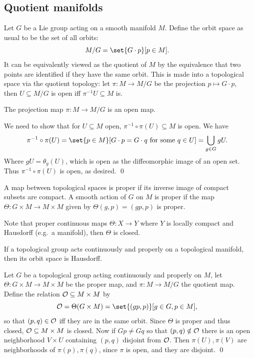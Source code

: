 \eexam

\subsection{Quotient manifolds}

\bdefn

    Let $G$ be a Lie group acting on a smooth manifold $M$.
    Define the {\emphcolor orbit space} as usual to be the set of all orbits:
    $$ M/G = \set{G\cdot p}[p\in M] . $$
    It can be equivalently viewed as the quotient of $M$ by the equivalence that two points are identified if they have the same orbit.
    This is made into a topological space via the quotient topology: let $\pi\colon M\to M/G$ be the projection $p\mapsto G\cdot p$,
    then $U\subseteq M/G$ is open iff $\pi^{-1}U\subseteq M$ is.

\edefn

\blemm

    The projection map $\pi\colon M\to M/G$ is an open map.

\elemm

\bproof

    We need to show that for $U\subseteq M$ open, $\pi^{-1}\circ\pi(U)\subseteq M$ is open.
    We have
    $$ \pi^{-1}\circ\pi(U) = \set{p\in M}[G\cdot p=G\cdot q\hbox{ for some $q\in U$}] = \bigcup_{g\in G}gU . $$
    Where $gU=\theta_g(U)$, which is open as the diffeomorphic image of an open set.
    Thus $\pi^{-1}\circ\pi(U)$ is open, as desired.
    \qed

\eproof

\bdefn

    A map between topological spaces is {\emphcolor proper} if its inverse image of compact subsets are compact.
    A smooth action of $G$ on $M$ is {\emphcolor proper} if the map $\Theta\colon G\times M\to M\times M$ given by $\Theta(g,p)=(gp,p)$ is proper.

\edefn

Note that proper continuous maps $\Theta\colon X\to Y$ where $Y$ is locally compact and Hausdorff (e.g.\ a manifold), then $\Theta$ is closed.

\blemm

    If a topological group acts continuously and properly on a topological manifold, then its orbit space is Hausdorff.

\elemm

\bproof

    Let $G$ be a topological group acting continuously and properly on $M$, let $\Theta\colon G\times M\to M\times M$ be the proper map,
    and $\pi\colon M\to M/G$ the quotient map.
    Define the relation ${\cal O}\subseteq M\times M$ by
    $$ \c O = \Theta(G\times M) = \set{(gp,p)}[g\in G,p\in M] , $$
    so that $(p,q)\in{\cal O}$ iff they are in the same orbit.
    Since $\Theta$ is proper and thus closed, ${\cal O}\subseteq M\times M$ is closed.
    Now if $Gp\neq Gq$ so that $(p,q)\notin{\cal O}$ there is an open neighborhood $V\times U$ containing $(p,q)$ disjoint from ${\cal O}$.
    Then $\pi(U),\pi(V)$ are neighborhoods of $\pi(p),\pi(q)$, since $\pi$ is open, and they are disjoint.
    \qed

